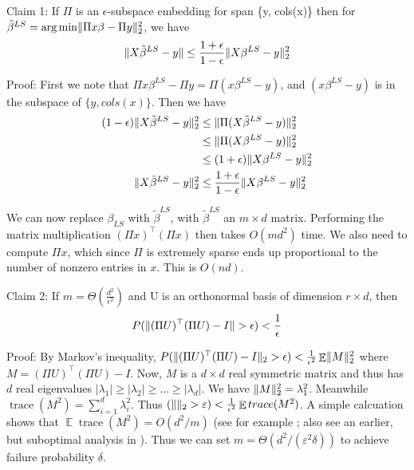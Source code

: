 \documentclass[11pt]{article}
\DeclareMathOperator*{\E}{\mathbb{E}}
\let\Pr\relax
\DeclareMathOperator*{\Pr}{\mathbb{P}}
\DeclarePairedDelimiter \norm {\|} {\|}
\newcommand{\eps}{\varepsilon}
\begin{document}
Claim 1: If $\Pi$ is an $\epsilon$-subspace embedding for span \{y, cols(x)\} then for $\tilde{\beta}^{LS} = \arg \min \norm{\Pi x \beta - \Pi y}_{2}^{2}$, we have $$
\norm{X\tilde{\beta}^{LS} - y} \leq \frac{1+\epsilon}{1 - \epsilon} \norm{X\beta^{LS} - y}_{2}^{2} $$

Proof: First we note that $\Pi x \beta^{LS} - \Pi y = \Pi (x \beta^{LS} - y)$, and $(x \beta^{LS} - y)$ is in the subspace of $\{y, cols(x)\}$. Then we have 
\begin{align*}
(1 - \epsilon) \norm{X\tilde{\beta}^{LS} - y}_{2}^{2} &\leq \norm{\Pi (X\tilde{\beta}^{LS} - y)}_{2}^{2} \\
&\leq \norm{\Pi (X\beta^{LS} - y)}_{2}^{2} \\
&\leq (1 + \epsilon) \norm{X\beta^{LS} - y}_{2}^{2} \\
\norm{X\tilde{\beta}^{LS} - y}_{2}^{2} &\leq \frac{1 + \epsilon}{1 - \epsilon} \norm{X\beta^{LS} - y}_{2}^{2}\\
\end{align*}

We can now replace $\beta_{LS}$ with $\tilde{\beta}^{LS}$, with $\tilde{\beta}^{LS}$ an $m \times d$ matrix. Performing the matrix multiplication $(\Pi x)^{\top} (\Pi x)$ then takes $O(md^{2})$ time. We also need to compute $\Pi x$, which since $\Pi$ is extremely sparse ends up proportional to the number of nonzero entries in $x$. This is $O(nd)$. 

Claim 2: If $m = \Theta(\frac{d^{2}}{\epsilon^{2}})$ and U is an orthonormal basis of dimension $r \times d$, then $$P(\norm{(\Pi U)^{\top}(\Pi U) - I} > \epsilon) < \frac{1}{\epsilon}$$

Proof: By Markov's inequality, $P(\norm{(\Pi U)^{\top}(\Pi U) - I}_{2} > \epsilon) < \frac{1}{\epsilon^{2}} \E \norm{M}_{2}^{2}$ where $M = (\Pi U)^{\top}(\Pi U) - I$. Now, $M$ is a $d\times d$ real symmetric matrix and thus has $d$ real eigenvalues $|\lambda_1| \ge |\lambda_2| \ge \ldots \ge |\lambda_d|$. We have $\norm{M}_2^2 = \lambda_1^2$. Meanwhile $\mathop{trace}(M^2) = \sum_{i=1}^d \lambda_i^2$. Thus $\Pr(\norm{}_2 > \eps) <  \frac{1}{\epsilon^{2}} \E \mathop{trace}(M^{2})$. A simple calcuation shows that $\E \mathop{trace}(M^{2}) = O(d^2/m)$ (see for example \cite{MengM13,NelsonN13}; also see an earlier, but suboptimal analysis in \cite{ClarksonW13}). Thus we can set $m = \Theta(d^2/(\eps^2\delta))$ to achieve failure probability $\delta$.


\end{document}
